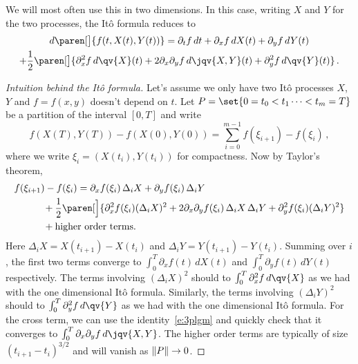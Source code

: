 \begin{remark}
  We will most often use this in two dimensions.
  In this case, writing $X$ and $Y$ for the two processes, the It\^o formula reduces to
  \begin{multline*}
    d\paren[\big]{f(t, X(t), Y(t))}
      = \partial_t f \, dt
	+ \partial_x f \, dX(t)
	+ \partial_y f \, dY(t)
    \\
	+ \frac{1}{2} \paren[\big]{
	    \partial_x^2 f \, d\qv{X}(t)
	    + 2 \partial_x \partial_y f \, d\jqv{X,Y}(t)
	    + \partial_y^2 f \, d\qv{Y}(t)
	}\,.
  \end{multline*}
\end{remark}

\begin{proof}[Intuition behind the It\^o formula]
  Let's assume we only have two It\^o processes $X$, $Y$ and $f = f(x, y)$ doesn't depend on $t$.
  Let $P = \set{0 = t_0 < t_1 \cdots < t_m = T}$ be a partition of the interval $[0, T]$ and write
  \begin{equation*}
    f(X(T), Y(T)) - f(X(0), Y(0))
      = \sum_{i=0}^{m-1}
	  f(\xi_{i+1})
	  - f(\xi_i)\,,
  \end{equation*}
  where we write $\xi_i = (X(t_i), Y(t_i))$ for compactness.
  Now by Taylor's theorem,
  \begin{align*}
    \MoveEqLeft
    f(\xi_{i+1}) - f(\xi_i)
      = \partial_x f(\xi_i) \, \Delta_i X
	+ \partial_y f(\xi_i) \, \Delta_i Y
    \\
      &\quad\mathbin+ \frac{1}{2} \paren[\Big]{
	    \partial_x^2 f(\xi_i) (\Delta_i X)^2
	    + 2 \partial_x \partial_y f(\xi_i) \, \Delta_i X \, \Delta_i Y
	    + \partial_y^2 f(\xi_i) (\Delta_i Y)^2
	}
    \\
      &\quad\mathbin + \text{higher order terms.}
  \end{align*}
  Here $\Delta_i X = X(t_{i+1}) - X(t_i)$ and $\Delta_i Y = Y(t_{i+1}) - Y(t_i)$.
  Summing over $i$, the first two terms converge to $\int_0^T \partial_x f(t) \, dX(t)$ and $\int_0^T \partial_y f(t) \, dY(t)$ respectively.
  The terms involving $(\Delta_i X)^2$ should to $\int_0^T \partial_x^2 f \, d\qv{X}$ as we had with the one dimensional It\^o formula.
  Similarly, the terms involving $(\Delta_i Y)^2$ should to $\int_0^T \partial_y^2 f \, d\qv{Y}$ as we had with the one dimensional It\^o formula.
  For the cross term, we can use the identity~\eqref{e:3plgm} and quickly check that it converges to $\int_0^T \partial_x \partial_y f \, d\jqv{X, Y}$.
  The higher order terms are typically of size $(t_{i+1} - t_i)^{3/2}$ and will vanish as $\lVert P\rVert \to 0$.
\end{proof}

